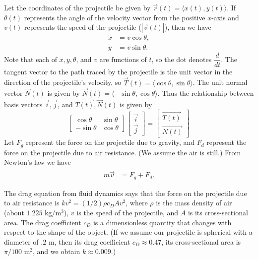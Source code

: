 Let the coordinates of the projectile be given by $\vec{r}(t) = \langle x(t), y(t) \rangle$.
If $\theta(t)$ represents the angle of the velocity vector from the positive $x$-axis and $v(t)$ represents the speed of the projectile ($ |\vec{v}(t) |$), then we have
\begin{align*}
\dot{x} &= v\cos{\theta},\\
\dot{y} &= v\sin{\theta}.
\end{align*} Note that each of $x,y,\theta$, and $v$ are functions of $t$, so the dot %
denotes $\dfrac{d}{dt}$.
The tangent vector to the path traced by the projectile is the unit vector in the direction of the projectile's velocity, so $\vec{T}(t) = \langle \cos{\theta}, \sin{\theta} \rangle$.
The unit normal vector $\vec{N} (t)$ is given by $\vec{N} (t)= \langle -\sin{\theta}, \cos{\theta} \rangle$.
Thus the relationship between basis vectors $\vec{i}, \vec{j}$, and $\vec{T(t)}, \vec{N}(t)$ is given by
\[\left[\begin{array}{cc}\cos{\theta} & \sin{\theta} \\-\sin{\theta} & \cos{\theta}\end{array}\right] \left[\begin{array}{c}\vec{i} \\\vec{j}\end{array}\right] = \left[\begin{array}{c}\vec{T(t)} \\\vec{N(t)}\end{array}\right]\]
Let $F_g$ represent the force on the projectile due to gravity, and $F_d$ represent the force on the projectile due to air resistance. (We assume the air is still.)
From Newton's law we have
\begin{align*}
m \dot{\vec{v}} &= F_g + F_d.
\end{align*}

The drag equation from fluid dynamics says that the force on the projectile due to air resistance is $k v^2 = (1/2)\rho c_D A v^2$, where $\rho$ is the mass density of air (about $1.225$ $\text{kg}/\text{m}^3$), $v$ is the speed of the projectile, and $A$ is its cross-sectional area.
The drag coefficient $c_D$ is a dimensionless quantity that changes with respect to the shape of the object.
(If we assume our projectile is spherical with a diameter of $.2$ m, then its drag coefficient $c_D \approx 0.47$, its cross-sectional area is $\pi/100$ $ \text{m}^2$, and we obtain $k \approx 0.009$.)

